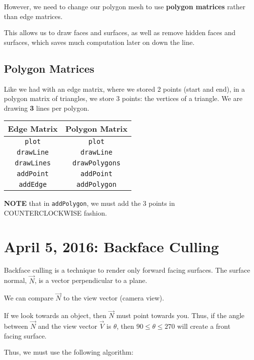 \documentclass[11pt,fleqn]{article}
\theoremstyle{definition}
\begin{document}
However, we need to change our polygon mesh to use \textbf{polygon matrices} rather
than edge matrices.

This allows us to draw faces and surfaces, as well as remove hidden faces and
surfaces, which saves much computation later on down the line.

\subsection{Polygon Matrices}

Like we had with an edge matrix, where we stored 2 points (start and end), in a
polygon matrix of triangles, we store 3 points: the vertices of a triangle. We are
drawing \textbf{3} lines per polygon.

\begin{table}[!htpb]
    \centering
    \begin{tabular}{|c|c|}
        \hline
        Edge Matrix & Polygon Matrix \\ \hline
        \texttt{plot} & \texttt{plot} \\ \hline
        \texttt{drawLine} & \texttt{drawLine} \\ \hline
        \texttt{drawLines} & \texttt{drawPolygons} \\ \hline
        \texttt{addPoint} & \texttt{addPoint} \\ \hline
        \texttt{addEdge} & \texttt{addPolygon} \\ \hline
    \end{tabular}
\end{table}

\textbf{NOTE} that in \texttt{addPolygon}, we must add the 3 points in
COUNTERCLOCKWISE fashion.

\section{April 5, 2016: Backface Culling}

Backface culling is a technique to render only forward facing surfaces. The surface
normal, $\vec{N}$, is a vector perpendicular to a plane.

We can compare $\vec{N}$ to the view vector (camera view).

If we look towards an object, then $\vec{N}$ must point towards you. Thus, if the
angle between $\vec{N}$ and the view vector $\vec{V}$ is $\theta$, then $90 \leq
\theta \leq 270$ will create a front facing surface.

Thus, we must use the following algorithm:
\end{document}
